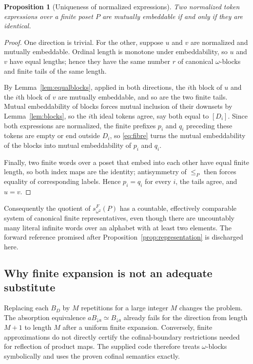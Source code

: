 \documentclass[11pt,a4paper]{article}
\numberwithin{equation}{section}
\newtheorem{proposition}[theorem]{Proposition}
\theoremstyle{definition}
\theoremstyle{remark}
\newcommand{\down}{\mathord{\downarrow}}
\newcommand{\eqv}{\simeq}
\newcommand{\Wordspace}[1]{s_{\omega^2}^{F}(#1)}
\begin{document}
\begin{proposition}[Uniqueness of normalized expressions]\label{prop:canonical}
Two normalized token expressions over a finite poset $P$ are mutually
embeddable if and only if they are identical.
\end{proposition}
\begin{proof}
One direction is trivial. For the other, suppose $u$ and $v$ are normalized
and mutually embeddable. Ordinal length is monotone under embeddability, so
$u$ and $v$ have equal lengths; hence they have the same number $r$ of
canonical $\omega$-blocks and finite tails of the same length.

By Lemma~\ref{lem:equalblocks}, applied in both directions, the $i$th block of
$u$ and the $i$th block of $v$ are mutually embeddable, and so are the two
finite tails. Mutual embeddability of blocks forces mutual inclusion of their
downsets by Lemma~\ref{lem:blocks}, so the $i$th ideal tokens agree, say both
equal to $[D_i]$. Since both expressions are normalized, the finite prefixes
$p_i$ and $q_i$ preceding these tokens are empty or end outside $D_i$, so
\eqref{eq:fibre} turns the mutual embeddability of the blocks into mutual
embeddability of $p_i$ and $q_i$.

Finally, two finite words over a poset that embed into each other have equal
finite length, so both index maps are the identity; antisymmetry of $\le_P$
then forces equality of corresponding labels. Hence $p_i=q_i$ for every $i$,
the tails agree, and $u=v$.
\end{proof}

Consequently the quotient of $\Wordspace P$ has a countable, effectively
comparable system of canonical finite representatives, even though there are
uncountably many literal infinite words over an alphabet with at least two
elements. The forward reference promised after
Proposition~\ref{prop:representation} is discharged here.

\subsection{Why finite expansion is not an adequate substitute}
Replacing each $B_D$ by $M$ repetitions for a large integer $M$ changes the
problem. The absorption equivalence $aB_{\down a}\eqv B_{\down a}$ already
fails for the direction from length $M+1$ to length $M$ after a uniform
finite expansion. Conversely, finite approximations do not directly
certify the cofinal-boundary restrictions needed for reflection of product
maps. The supplied code therefore treats $\omega$-blocks symbolically and
uses the proven cofinal semantics exactly.
\end{document}
